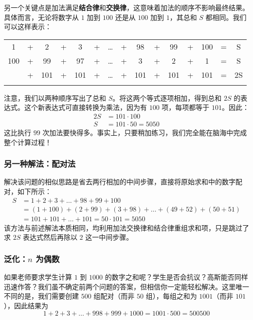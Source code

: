 另一个关键点是加法满足\textbf{结合律}和\textbf{交换律}，这意味着加法的顺序不影响最终结果。具体而言，无论将数字从 $1$ 加到 $100$ 还是从 $100$ 加到 $1$，其总和 $S$ 都相同。我们可以这样表示：
\begin{center}
    \begin{tabular}{ccccccccccccccc}
          1 & + &   2 & + &   3 & + & \dots & + &  98 & + &  99 & + & 100 & = & S\\\noalign{\smallskip\smallskip}
        100 & + &  99 & + &  97 & + & \dots & + &   3 & + &   2 & + &   1 & = & S\\\noalign{\smallskip\smallskip}
        \hline
        101 & + & 101 & + & 101 & + & \dots & + & 101 & + & 101 & + & 101 & = & 2S\\\noalign{\smallskip\smallskip}
    \end{tabular}
\end{center}
注意，我们以两种顺序写出了总和 $S$。将这两个等式逐项相加，得到总和 $2S$ 的表达式。这个新表达式可直接转换为乘法，因为有 $100$ 项，每项都等于 $101$。因此：
\begin{align*}
    2S &= 101 \cdot 100 \\
     S &= 101 \cdot 50 = 5050
\end{align*}
这比执行 $99$ 次加法要快得多。事实上，只要稍加练习，我们完全能在脑海中完成整个计算过程！

\subsubsection*{另一种解法：配对法}

解决该问题的相似思路是省去两行相加的中间步骤，直接将原始求和中的数字配对，如下所示：
\begin{align*}
    S &= 1 + 2 + 3 + \dots + 98 + 99 + 100 \\
    &= (1 + 100) + (2 + 99) + (3 + 98) + \dots + (49 + 52) + (50 + 51) \\
    &= 101 + 101 + \dots + 101 = 50 \cdot 101 = 5050
\end{align*}
该方法与前述解法本质相同，均利用加法交换律和结合律重组求和项，只是跳过了求 $2S$ 表达式然后再除以 $2$ 这一中间步骤。

\subsubsection*{泛化：$n$ 为偶数}

如果老师要求学生计算 $1$ 到 $1000$ 的数字之和呢？学生是否会抗议？高斯能否同样迅速作答？我们虽不确定前两个问题的答案，但相信你一定能轻松解决。这里唯一不同的是，我们需要创建 $500$ 组配对（而非 $50$ 组），每组之和为 $1001$（而非 $101$），因此结果为
\[1 + 2 + 3 + \dots + 998 + 999 + 1000 = 1001 \cdot 500 = 500500\]

